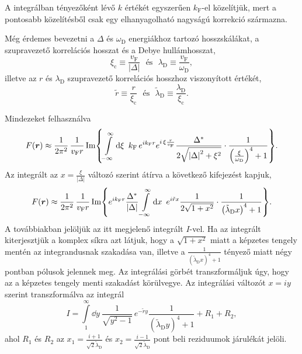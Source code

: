 \documentclass[a4paper,12pt,titlepage]{article}
\newcommand{\RR}{{\vb*{r}}}
\newcommand{\kF}{{k_\text{F}}}
\newcommand{\vF}{{v_\text{F}}}
\newcommand{\xic}{{\xi_\text{c}}}
\begin{document}
A integrálban tényezőként lévő $k$ értékét egyszerűen $\kF$-el közelítjük, mert a pontosabb közelítésből csak egy elhanyagolható nagyságú korrekció származna.

Még érdemes bevezetni a $\Delta$ és $\omega_\text{D}$ energiákhoz tartozó hosszskálákat, a szupravezető korrelációs hosszat és a Debye hullámhosszat,
\begin{equation}
	\xic \equiv \frac{\vF}{\left| \Delta \right|} ~~~ \text{és} ~~~ \lambda_\text{D} \equiv \frac{\vF}{\omega_\text{D}},
\end{equation}
illetve az $r$ és $\lambda_\text{D}$ szupravezető korrelációs hosszhoz viszonyított értékét,
\begin{equation}
	\tilde{r} \equiv \frac{r}{\xic} ~~~ \text{és} ~~~ \tilde{\lambda}_\text{D} \equiv \frac{\lambda_\text{D}}{\xic}.
\end{equation}

Mindezeket felhasználva
\begin{equation}
	F(\RR) \approx \frac{1}{2 \pi^2} \, \frac{1}{\vF r} \Im{ \int\limits_{-\infty}^\infty \dd{\xi} ~ \kF \, e^{i \kF r} e^{i \, \xi \frac{r}{\vF}} \frac{\Delta^*}{2 \sqrt{\left| \Delta \right|^2 + \xi^2}} \cdot \frac{1}{\left( \frac{\xi}{\omega_\text{D}} \right)^4 + 1} }.
\end{equation}
Az integrált az $x = \frac{\xi}{\left| \Delta \right|}$ változó szerint átírva a következő kifejezést kapjuk,
\begin{equation} \label{f-def}
	F(\RR) \approx \frac{1}{2 \pi^2} \, \frac{1}{\vF r} \Im{ e^{i \kF r} \frac{\Delta^*}{\left| \Delta \right|} \int\limits_{-\infty}^\infty \dd{x} ~ e^{i \tilde{r} x} \frac{1}{2 \sqrt{1 + x^2}} \cdot \frac{1}{\left( \tilde{\lambda}_\text{D} x \right)^4 + 1} }.
\end{equation}
A továbbiakban jelöljük az itt megjelenő integrált $I$-vel.  Ha az integrált kiterjesztjük a komplex síkra azt látjuk, hogy a $\sqrt{1 + x^2}$ miatt a képzetes tengely mentén az integrandusnak szakadása van, illetve a $\frac{1}{\left( \tilde{\lambda}_\text{D} x \right)^4 + 1}$ tényező miatt négy pontban pólusok jelennek meg.  Az integrálási görbét transzformáljuk úgy, hogy az a képzetes tengely menti szakadást körülvegye.  Az integrálási változót $x = i y$ szerint transzformálva az integrál
\begin{equation}
	I = \int\limits_1^\infty \dd{y} ~ \frac{1}{\sqrt{y^2 - 1}} \, e^{-\tilde{r} y} \frac{1}{\left( \tilde{\lambda}_\text{D} y \right)^4 + 1} + R_1 + R_2,
\end{equation}
ahol $R_1$ és $R_2$ az $x_1 = \frac{i + 1}{\sqrt{2} \tilde{\lambda}_\text{D}}$ és $x_2 = \frac{i - 1}{\sqrt{2} \tilde{\lambda}_\text{D}}$ pont beli reziduumok járulékát jelöli.
\end{document}
